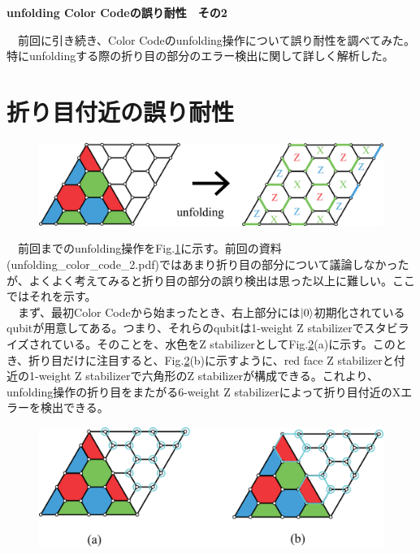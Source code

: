 \documentclass[a4paper,10pt]{ltjsarticle}
\begin{document}
\centerline{\LARGE\bfseries unfolding Color Codeの誤り耐性　その2}
\vspace{10pt}
　前回に引き続き、Color Codeのunfolding操作について誤り耐性を調べてみた。特にunfoldingする際の折り目の部分のエラー検出に関して詳しく解析した。
\section{折り目付近の誤り耐性}{

    \begin{figure}[h]
        \centering
        \includegraphics[scale=0.2]{figure/figure1.eps}
        \caption{ }
        \label{figure1}
    \end{figure}

    　前回までのunfolding操作をFig.\ref{figure1}に示す。前回の資料(unfolding\_color\_code\_2.pdf)ではあまり折り目の部分について議論しなかったが、よくよく考えてみると折り目の部分の誤り検出は思った以上に難しい。ここではそれを示す。\\
    　まず、最初Color Codeから始まったとき、右上部分には$\ket{0}$初期化されているqubitが用意してある。つまり、それらのqubitは1-weight Z stabilizerでスタビライズされている。そのことを、水色をZ stabilizerとしてFig.\ref{figure2}(a)に示す。このとき、折り目だけに注目すると、Fig.\ref{figure2}(b)に示すように、red face Z stabilizerと付近の1-weight Z stabilizerで六角形のZ stabilizerが構成できる。これより、unfolding操作の折り目をまたがる6-weight Z stabilizerによって折り目付近のXエラーを検出できる。

    \begin{figure}[h]
        \centering
        \includegraphics[scale=0.2]{figure/figure2.eps}
        \caption{ }
        \label{figure2}
    \end{figure}

}
\end{document}
